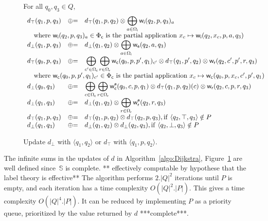 \documentclass[runningheads]{llncs}
\def\<#1>{\langle #1 \rangle}
\newcommand{\Semiring}{\mathbb{S}}
\def\wei{\mathsf{w}}
\newcommand{\call}[1]{\ensuremath #1} %
\newcommand{\return}[1]{\ensuremath #1} %
\def\Omegai{{\Omega_\mathsf{i}}}
\def\Omegac{{\Omega_\mathsf{c}}}
\def\Omegar{{\Omega_\mathsf{r}}}
\def\Phic{{\Phi_\mathsf{c}}}
\def\weii{{\wei_\mathsf{i}}}
\def\weic{{\wei_\mathsf{c}}}
\def\weir{{\wei_\mathsf{r}}}
\def\weie{{\wei_\mathsf{e}}}
\def\weiec{{\wei^\mathsf{e}_\mathsf{c}}}
\def\weier{{\wei^\mathsf{e}_\mathsf{r}}}
\newcommand{\opluseq}{\ensuremath\mathrel{\oplus}=}
\begin{document}
\begin{figure}
For all $q_0, q_3 \in Q$, %
\[
\begin{array}{lcl}
d_\top(q_1, p, q_3) & \opluseq &
  d_\top(q_1, p, q_2) \otimes 
  \displaystyle\bigoplus_{a \in \Omegai} \weii(q_2, p, q_3)_a\\
\multicolumn{3}{l}{\quad
\mathrm{where~} \weii(q_2, p, q_3)_a \in \Phic
\mathrm{~is~the~partial~application~}
x_c \mapsto \weii(q_2, x_c, p, a, q_3)}\\
%
d_\bot(q_1, p, q_3) & \opluseq &
  d_\bot(q_1, q_2) \otimes 
  \displaystyle\bigoplus_{a \in \Omegai} \weie(q_2, a, q_3)\\
%     
d_\top(q_0, p, q_3) & \opluseq &
  \displaystyle\bigoplus_{{\call{c}'} \in \Omegac} 
  \displaystyle\bigoplus_{{\return{r}} \in \Omegar} 
  \weic(q_0, p, p', q_1)_{c'} \otimes 
  d_\top(q_1, p', q_2) \otimes
  \weir(q_2, c', p', r, q_3)\\
\multicolumn{3}{l}{\quad
\mathrm{where~} \weic(q_0, p, p', q_1)_{c'} \in \Phic
\mathrm{~is~the~partial~application~}
x_c \mapsto \weic(q_0, p, x_c, c', p', q_1)}\\[2pt]
%
d_\bot(q_0, q_3) & \opluseq &
  \displaystyle\bigoplus_{{\call{c}} \in \Omegac} 
  \displaystyle\bigoplus_{{\return{r}} \in \Omegar} 
  \weiec(q_0, c, p, q_1) \otimes 
   d_\top(q_1, p, q_2)(c) \otimes
  \weir(q_2, c, p, r, q_3)\\
%
d_\bot(q_1, q_3) & \opluseq &
  d_\bot(q_1, q_2) \otimes 
  \displaystyle\bigoplus_{\return{r} \in \Omegar} \weier(q_2, {\return{r}}, q_3)\\
%
d_\top(q_1, p, q_3) & \opluseq & 
  d_\top(q_1, p, q_2) \otimes d_\top(q_2, p, q_3), 
  \mathrm{if~} \< q_2, \top, q_3> \notin P \\
%
d_\bot(q_1, q_3) & \opluseq & 
  d_\bot(q_1, q_2) \otimes d_\bot(q_2, q_3), \mathrm{if~} \< q_2, \bot, q_3> \notin P \\
\end{array}
\]
%
\caption{Update $d_\bot$ with $\<q_1, q_2>$ or $d_\top$ with $\< q_1, p, q_2>$.} 
\label{fig:best-update}
\end{figure}


\noindent
The infinite sums in the updates of $d$ in Algorithm~\ref{algo:Dijkstra}, 
Figure~\ref{fig:best-update}
are well defined
since~$\Semiring$ is complete.
** effectively computable by hypothese that the label theory is effective**
The algorithm performs $2.|Q|^2$ iterations until $P$ is empty, 
and each iteration has a time complexity $O(|Q|^2 . |P|)$.
This gives a time complexity $O(|Q|^4 . |P|)$. 
It can be reduced by implementing $P$ as a priority queue, 
prioritized by the value returned by $d$
***complete***. %
\end{document}
